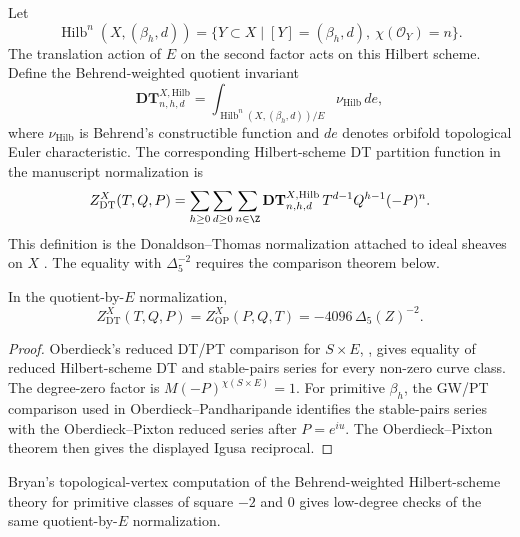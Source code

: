 \begin{definition}
Let
$$
\operatorname{Hilb}^n(X,(\beta_h,d))
=
\{Y\subset X\mid [Y]=(\beta_h,d),\ \chi(\mathcal O_Y)=n\}.
$$
The translation action of $E$ on the second factor acts on this Hilbert
scheme.  Define the Behrend-weighted quotient invariant
$$
\mathbf{DT}^{X,\mathrm{Hilb}}_{n,h,d}
=
\int_{\operatorname{Hilb}^n(X,(\beta_h,d))/E}\nu_{\mathrm{Hilb}}\,de,
$$
where $\nu_{\mathrm{Hilb}}$ is Behrend's constructible function
\cite{BEHREND} and $de$ denotes orbifold topological Euler
characteristic.  The corresponding Hilbert-scheme DT partition function
in the manuscript normalization is
$$
Z^X_{\mathrm{DT}}(T,Q,P)
=
\sum_{h\geq0}\sum_{d\geq0}\sum_{n\in\Z}
\mathbf{DT}^{X,\mathrm{Hilb}}_{n,h,d}\,
T^{d-1}Q^{h-1}(-P)^n.
$$
This definition is the Donaldson--Thomas normalization attached to
ideal sheaves on $X$ \cite{DT}.  The equality with \(\Delta_5^{-2}\)
requires the comparison theorem below.
\end{definition}

\begin{theorem}
\label{thm:hilb-dt-scalar-normalization-status}
In the quotient-by-\(E\) normalization,
$$
Z^X_{\mathrm{DT}}(T,Q,P)
=Z^X_{\mathrm{OP}}(P,Q,T)
=-4096\,\Delta_5(Z)^{-2}.
$$
\end{theorem}

\begin{proof}
Oberdieck's reduced DT/PT comparison for \(S\times E\),
\cite[Theorem 3(i)]{OberdieckReducedPT}, gives equality of reduced
Hilbert-scheme DT and stable-pairs series for every non-zero curve
class.  The degree-zero factor is \(M(-P)^{\chi(S\times E)}=1\).  For
primitive \(\beta_h\), the GW/PT comparison used in
Oberdieck--Pandharipande \cite[Proposition 5]{OPand} identifies the
stable-pairs series with
the Oberdieck--Pixton reduced series after \(P=e^{iu}\).  The
Oberdieck--Pixton theorem then gives the displayed Igusa reciprocal.
\end{proof}

\begin{remark}
Bryan's topological-vertex computation of the Behrend-weighted
Hilbert-scheme theory for primitive classes of square $-2$ and $0$
\cite{BRYAN} gives low-degree checks of the same quotient-by-\(E\)
normalization.
\end{remark}

